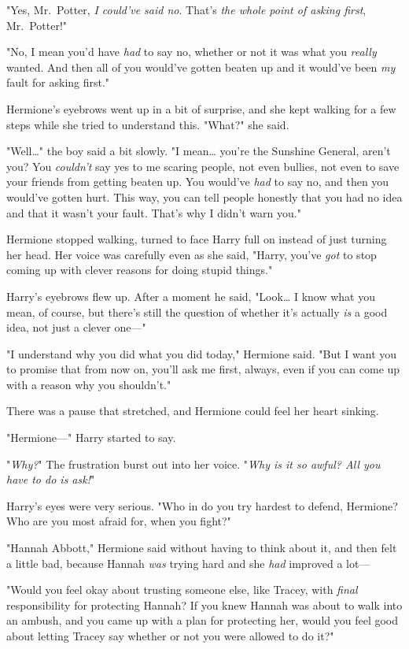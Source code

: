 "Yes, Mr.~Potter, \emph{I could've said no}. That's \emph{the whole point of 
asking first}, Mr.~Potter!"

"No, I mean you'd have \emph{had} to say no, whether or not it was what you 
\emph{really} wanted. And then all of you would've gotten beaten up and it 
would've been \emph{my} fault for asking first."

Hermione's eyebrows went up in a bit of surprise, and she kept walking for a 
few steps while she tried to understand this. "What?" she said.

"Well{\ldots}" the boy said a bit slowly. "I mean{\ldots} you're the Sunshine 
General, aren't you? You \emph{couldn't} say yes to me scaring people, not even 
bullies, not even to save your friends from getting beaten up. You would've 
\emph{had} to say no, and then you would've gotten hurt. This way, you can tell 
people honestly that you had no idea and that it wasn't your fault. That's why 
I didn't warn you."

Hermione stopped walking, turned to face Harry full on instead of just turning 
her head. Her voice was carefully even as she said, "Harry, you've \emph{got} 
to stop coming up with clever reasons for doing stupid things."

Harry's eyebrows flew up. After a moment he said, "Look{\ldots} I know what you 
mean, of course, but there's still the question of whether it's actually 
\emph{is} a good idea, not just a clever one---"

"I understand why you did what you did today," Hermione said. "But I want you 
to promise that from now on, you'll ask me first, always, even if you can come 
up with a reason why you shouldn't."

There was a pause that stretched, and Hermione could feel her heart sinking.

"Hermione---" Harry started to say.

"\emph{Why?}" The frustration burst out into her voice. "\emph{Why is it so 
awful? All you have to do is ask!}"

Harry's eyes were very serious. "Who in \SPHEW do you try hardest to 
defend, Hermione? Who are you most afraid for, when you fight?"

"Hannah Abbott," Hermione said without having to think about it, and then felt 
a little bad, because Hannah \emph{was} trying hard and she \emph{had} improved 
a lot---

"Would you feel okay about trusting someone else, like Tracey, with 
\emph{final} responsibility for protecting Hannah? If you knew Hannah was about 
to walk into an ambush, and you came up with a plan for protecting her, would 
you feel good about letting Tracey say whether or not you were allowed to do 
it?"

